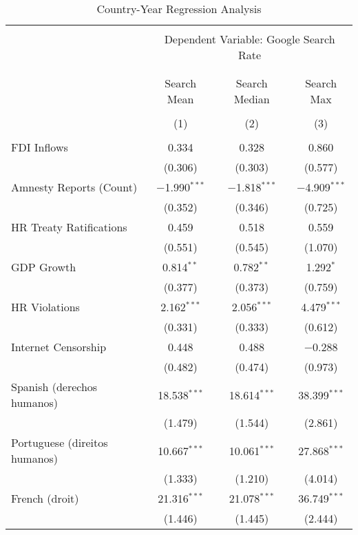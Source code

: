 
\begin{table}[!htbp] \centering 
  \caption{Country-Year Regression Analysis} 
  \label{} 
\begin{tabular}{@{\extracolsep{5pt}}lccc} 
\\[-1.8ex]\hline 
\hline \\[-1.8ex] 
 & \multicolumn{3}{c}{Dependent Variable: Google Search Rate} \\ 
\cline{2-4} 
\\[-1.8ex] & \multicolumn{3}{c}{ } \\ 
 & Search Mean & Search Median & Search Max \\ 
\\[-1.8ex] & (1) & (2) & (3)\\ 
\hline \\[-1.8ex] 
 FDI Inflows & 0.334 & 0.328 & 0.860 \\ 
  & (0.306) & (0.303) & (0.577) \\ 
  Amnesty Reports (Count) & $-$1.990$^{***}$ & $-$1.818$^{***}$ & $-$4.909$^{***}$ \\ 
  & (0.352) & (0.346) & (0.725) \\ 
  HR Treaty Ratifications & 0.459 & 0.518 & 0.559 \\ 
  & (0.551) & (0.545) & (1.070) \\ 
  GDP Growth & 0.814$^{**}$ & 0.782$^{**}$ & 1.292$^{*}$ \\ 
  & (0.377) & (0.373) & (0.759) \\ 
  HR Violations & 2.162$^{***}$ & 2.056$^{***}$ & 4.479$^{***}$ \\ 
  & (0.331) & (0.333) & (0.612) \\ 
  Internet Censorship & 0.448 & 0.488 & $-$0.288 \\ 
  & (0.482) & (0.474) & (0.973) \\ 
  Spanish (derechos humanos) & 18.538$^{***}$ & 18.614$^{***}$ & 38.399$^{***}$ \\ 
  & (1.479) & (1.544) & (2.861) \\ 
  Portuguese (direitos humanos) & 10.667$^{***}$ & 10.061$^{***}$ & 27.868$^{***}$ \\ 
  & (1.333) & (1.210) & (4.014) \\ 
  French (droit) & 21.316$^{***}$ & 21.078$^{***}$ & 36.749$^{***}$ \\ 
  & (1.446) & (1.445) & (2.444) \\ 

\end{tabular}
\end{table}
